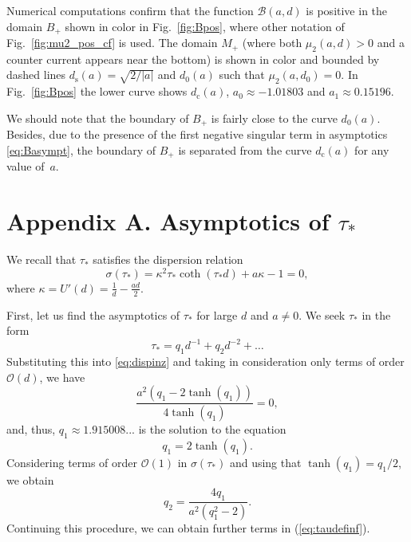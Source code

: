 \documentclass[oneside,a4paper,11pt]{article}
\theoremstyle{thmstyletwo}%
\theoremstyle{thmstylethree}%
\numberwithin{equation}{section}
\def\dcrit{d_{\textrm{c}}}
\def\ds{d_{\textrm{s}}}
\def\taust{\tau_{*}}
\def\Disp{\sigma}
\def\dUd{\kappa}
\def\mddU{a}
\def\Obig{\mathcal{O}}
\begin{document}
Numerical computations confirm that the function $\mathcal{B}(a,d)$ is positive in the domain $B_+$ shown in color in Fig.~\ref{fig:Bpos}, where other notation of  Fig.~\ref{fig:mu2_pos_cf} is used. The domain $M_+$ (where both $\mu_2(a,d)>0$ and a counter current appears near the bottom) is shown in color and bounded by dashed lines $\ds(a)=\sqrt{2/|a|}$ and $d_0(a)$ such that $\mu_2(a,d_0)=0$. In Fig.~\ref{fig:Bpos} the lower curve shows $\dcrit(a)$, $a_0\approx-1.01803$ and $a_1\approx0.15196$.

We should note that the boundary of $B_+$ is fairly close to the curve $d_0(a)$. Besides, due to the presence of the first negative singular term in asymptotics \eqref{eq:Basympt}, the boundary of $B_+$ is separated from the curve $\dcrit(a)$ for any value of~$a$.

\appendix

\renewcommand{\theequation}{A.\arabic{equation}}
\setcounter{equation}{0}

\section*{Appendix A. Asymptotics of $\taust$}

We recall that $\taust$ satisfies the dispersion relation
\begin{equation}
\Disp(\taust)=\dUd^2 \taust \coth(\taust d)+\mddU\dUd-1=0,
\label{eq:dispinz}
\end{equation}
where $\dUd=U'(d)=\frac{1}{d}-\frac{ad}{2}$.

First, let us  find the asymptotics of $\taust$ for large $d$ and $a\neq0$.  We seek $\taust$ in the form
\begin{equation}
\taust= q_1d^{-1} + q_2d^{-2} + \dots
\label{eq:taudefinf}
\end{equation}
Substituting this into  \eqref{eq:dispinz} and taking in consideration only terms of order $\Obig(d)$, we have
\[
\frac{a^2(q_1-2\tanh(q_1))}{4\tanh(q_1)}=0,
\]
and, thus, $q_1\approx 1.915008...$ is the solution to the equation
\begin{equation}
q_1=2\tanh(q_1).
\label{eq:C1def}
\end{equation}
Considering terms of order $\Obig(1)$ in $\Disp(\taust)$ and using that $\tanh(q_1)= q_1/2$, we obtain
\begin{equation*}
q_2=\frac{4q_1}{a^2(q_1^2-2)}.
\end{equation*}
Continuing this procedure, we can obtain further terms in (\ref{eq:taudefinf}).
\end{document}
